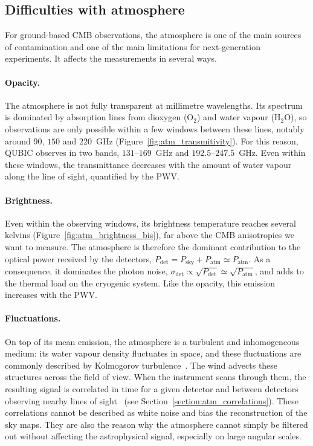 \documentclass[a4paper,11pt]{article}
\begin{document}
\subsection{Difficulties with atmosphere}
\label{sec:atm_difficulties}

For ground-based CMB observations, the atmosphere is one of the main sources of contamination and one of the main limitations for next-generation experiments. It affects the measurements in several ways.

\paragraph{Opacity.} The atmosphere is not fully transparent at millimetre wavelengths. Its spectrum is dominated by absorption lines from dioxygen (O$_2$) and water vapour (H$_2$O), so observations are only possible within a few windows between these lines, notably around $90$, $150$ and $220$~GHz (Figure~\ref{fig:atm_transmitivity}). For this reason, QUBIC observes in two bands, $131$--$169$~GHz and $192.5$--$247.5$~GHz. Even within these windows, the transmittance decreases with the amount of water vapour along the line of sight, quantified by the PWV.

\paragraph{Brightness.} Even within the observing windows, its brightness temperature reaches several kelvins (Figure~\ref{fig:atm_brightness_bis}), far above the CMB anisotropies we want to measure. The atmosphere is therefore the dominant contribution to the optical power received by the detectors, $P_\mathrm{det} = P_\mathrm{sky} + P_\mathrm{atm} \simeq P_\mathrm{atm}$. As a consequence, it dominates the photon noise, $\sigma_\mathrm{det} \propto \sqrt{P_\mathrm{det}} \simeq \sqrt{P_\mathrm{atm}}$, and adds to the thermal load on the cryogenic system. Like the opacity, this emission increases with the PWV.

\paragraph{Fluctuations.} On top of its mean emission, the atmosphere is a turbulent and inhomogeneous medium: its water vapour density fluctuates in space, and these fluctuations are commonly described by Kolmogorov turbulence~\cite{Kolmogorov1941,Tatarski1961}. The wind advects these structures across the field of view. When the instrument scans through them, the resulting signal is correlated in time for a given detector and between detectors observing nearby lines of sight~\cite{errard2015,morris2022} (see Section~\ref{section:atm_correlations}). These correlations cannot be described as white noise and bias the reconstruction of the sky maps. They are also the reason why the atmosphere cannot simply be filtered out without affecting the astrophysical signal, especially on large angular scales.
\end{document}
